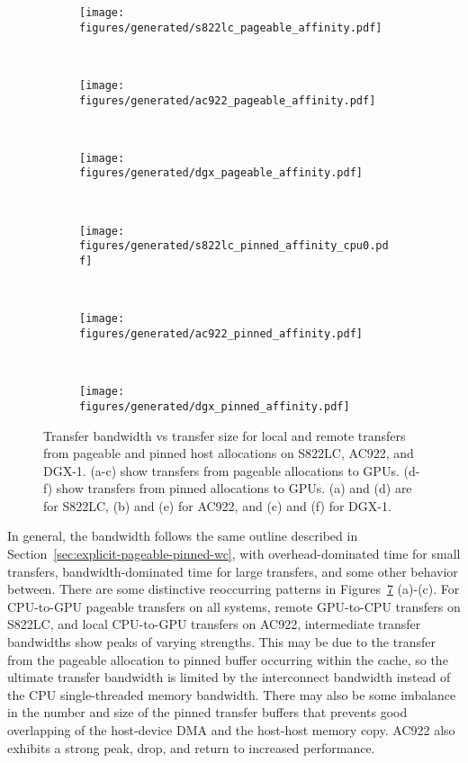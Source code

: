 \begin{figure}[ht]
	\centering
	\begin{subfigure}[b]{0.31\textwidth}
		\texttt{[image: figures/generated/s822lc\_pageable\_affinity.pdf]}
		\caption{}
		\label{fig:minsky_pageable_affinity}
	\end{subfigure}
	~
	\begin{subfigure}[b]{0.31\textwidth}
		\texttt{[image: figures/generated/ac922\_pageable\_affinity.pdf]}
		\caption{}
		\label{fig:hal_pageable_affinity}
	\end{subfigure}
	~
	\begin{subfigure}[b]{0.31\textwidth}
		\texttt{[image: figures/generated/dgx\_pageable\_affinity.pdf]}
		\caption{}
		\label{fig:dgx_pageable_affinity}
	\end{subfigure}
	\\
	\begin{subfigure}[b]{0.31\textwidth}
		\texttt{[image: figures/generated/s822lc\_pinned\_affinity\_cpu0.pdf]}
		\caption{}
		\label{fig:minsky_pinned_affinity}
	\end{subfigure}
	~
	\begin{subfigure}[b]{0.31\textwidth}
		\texttt{[image: figures/generated/ac922\_pinned\_affinity.pdf]}
		\caption{}
		\label{fig:hal_pinned_affinity}
	\end{subfigure}
	~
	\begin{subfigure}[b]{0.31\textwidth}
		\texttt{[image: figures/generated/dgx\_pinned\_affinity.pdf]}
		\caption{}
		\label{fig:dgx_pinned_affinity}
		
	\end{subfigure}
	\caption[CPU-GPU affinity and \texttt{cudaMemcpy} bandwidth]{
		Transfer bandwidth vs transfer size for local and remote transfers from pageable and pinned host allocations on S822LC, AC922, and DGX-1.
		(a-c) show transfers from pageable allocations to GPUs.
		(d-f) show transfers from pinned allocations to GPUs.
		(a) and (d) are for S822LC, (b) and (e) for AC922, and (c) and (f) for DGX-1.
	}
	\label{fig:cpu-gpu-affinity-direction}
\end{figure}

In general, the bandwidth follows the same outline described in Section~\ref{sec:explicit-pageable-pinned-wc}, with overhead-dominated time for small transfers, bandwidth-dominated time for large transfers, and some other behavior between.
There are some distinctive reoccurring patterns in Figures~\ref{fig:cpu-gpu-affinity-direction} (a)-(c).
For CPU-to-GPU pageable transfers on all systems, remote GPU-to-CPU transfers on S822LC, and local CPU-to-GPU transfers on AC922, intermediate transfer bandwidths show peaks of varying strengths.
This may be due to the transfer from the pageable allocation to pinned buffer occurring within the cache, so the ultimate transfer bandwidth is limited by the interconnect bandwidth instead of the CPU single-threaded memory bandwidth.
There may also be some imbalance in the number and size of the pinned transfer buffers that prevents good overlapping of the host-device DMA and the host-host memory copy.
AC922 also exhibits a strong peak, drop, and return to increased performance.

